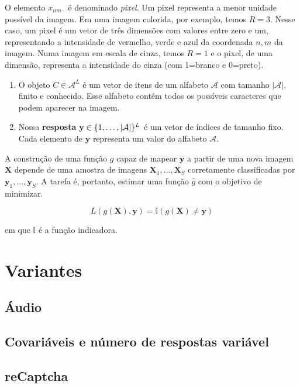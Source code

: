 \documentclass[12pt,]{report}
\begin{document}
O elemento \(x_{nm\cdot}\) é denominado \emph{pixel}. Um pixel
representa a menor unidade possível da imagem. Em uma imagem colorida,
por exemplo, temos \(R=3\). Nesse caso, um pixel é um vetor de três
dimensões com valores entre zero e um, representando a intensidade de
vermelho, verde e azul da coordenada \(n,m\) da imagem. Numa imagem em
escala de cinza, temos \(R=1\) e o pixel, de uma dimensão, representa a
intensidade do cinza (com 1=branco e 0=preto).

\begin{enumerate}
\def\labelenumi{\arabic{enumi}.}
\setcounter{enumi}{1}
\item
  O objeto \(C \in \mathcal A^L\) é um vetor de itens de um alfabeto
  \(\mathcal A\) com tamanho \(|\mathcal A|\), finito e conhecido. Esse
  alfabeto contém todos os possíveis caracteres que podem aparecer na
  imagem.
\item
  Nossa \textbf{resposta}
  \(\mathbf y \in \mathbb \{1, \dots, |\mathcal A|\}^L\) é um vetor de
  índices de tamanho fixo. Cada elemento de \(\mathbf y\) representa um
  valor do alfabeto \(\mathcal A\).
\end{enumerate}

A construção de uma função \(g\) capaz de mapear \(\mathbf y\) a partir
de uma nova imagem \(\mathbf X\) depende de uma amostra de imagens
\(\mathbf X_1, \dots, \mathbf X_S\) corretamente classificadas por
\(\mathbf y_1, \dots, \mathbf y_S\). A tarefa é, portanto, estimar uma
função \(\hat g\) com o objetivo de minimizar.

\[
L(g(\mathbf X), \mathbf y) = \mathbb I(g(\mathbf X) \neq \mathbf y)
\]

em que \(\mathbb I\) é a função indicadora.

\section{Variantes}\label{variantes}

\subsection{Áudio}\label{audio}

\subsection{Covariáveis e número de respostas
variável}\label{covariaveis-e-numero-de-respostas-variavel}

\subsection{reCaptcha}\label{recaptcha}
\end{document}

